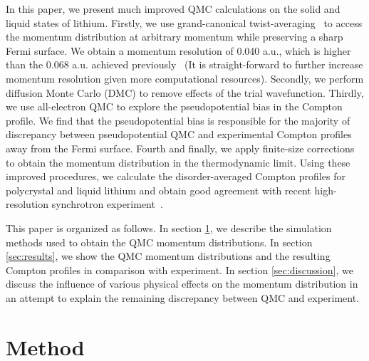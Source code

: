 \documentclass[aps,prb,showpacs,preprintnumbers,amsmath,amssymb,superscriptaddress,twocolumn]{revtex4-1}
\begin{document}
In this paper, we present much improved QMC calculations on the solid and liquid states of lithium. Firstly, we use grand-canonical twist-averaging~\cite{Lin2001,Holzmann2016} to access the momentum distribution at arbitrary momentum while preserving a sharp Fermi surface. We obtain a momentum resolution of 0.040 a.u., which is higher than the 0.068 a.u. achieved previously~\cite{Filippi1999} (It is straight-forward to further increase momentum resolution given more computational resources). Secondly, we perform diffusion Monte Carlo (DMC) to remove effects of the trial wavefunction. Thirdly, we use all-electron QMC to explore the pseudopotential bias in the Compton profile. We find that the pseudopotential bias is responsible for the majority of discrepancy between pseudopotential QMC and experimental Compton profiles away from the Fermi surface. Fourth and finally, we apply finite-size corrections~\cite{Holzmann2009,Holzmann2011} to obtain the momentum distribution in the thermodynamic limit. Using these improved procedures, we calculate the disorder-averaged Compton profiles for polycrystal and liquid lithium and obtain good agreement with recent high-resolution synchrotron experiment~\cite{Nozomu2019}.

This paper is organized as follows. In section \ref{sec:method}, we describe the simulation methods used to obtain the QMC momentum distributions. In section \ref{sec:results}, we show the QMC momentum distributions and the resulting Compton profiles in comparison with experiment. In section \ref{sec:discussion}, we discuss the influence of various physical effects on the momentum distribution in an attempt to explain the remaining discrepancy between QMC and experiment.

\section{Method} \label{sec:method}
\end{document}
